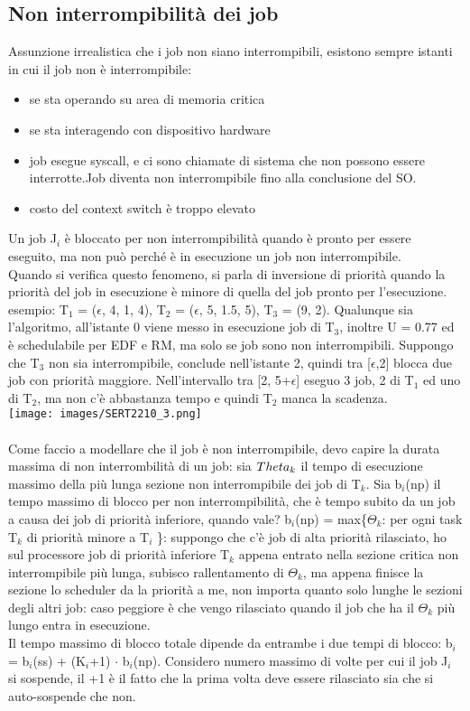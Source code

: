 \documentclass[18px]{article}
\begin{document}
\subsection{Non interrompibilità dei job}
Assunzione irrealistica che i job non siano interrompibili, esistono sempre istanti in cui il job non è interrompibile:
\begin{itemize}
\item se sta operando su area di memoria critica
\item se sta interagendo con dispositivo hardware
\item job esegue syscall, e ci sono chiamate di sistema che non possono essere interrotte.Job diventa non interrompibile fino alla conclusione del SO.
\item costo del context switch è troppo elevato
\end{itemize}
Un job J$_{i}$ è bloccato per non interrompibilità quando è  pronto per essere eseguito, ma non può perché è in esecuzione un job non interrompibile.\\ Quando si verifica questo fenomeno, si parla di inversione di priorità quando la priorità del job in esecuzione è minore di quella del job pronto per l'esecuzione. esempio: T$_{1}$ = ($\epsilon$, 4, 1, 4), T$_{2}$ = ($\epsilon$, 5, 1.5, 5), T$_{3}$ = (9, 2). Qualunque sia l'algoritmo, all'istante 0 viene messo in esecuzione job di T$_{3}$, inoltre U = 0.77 ed è schedulabile per EDF e RM, ma solo se job sono non interrompibili. Suppongo che T$_{3}$ non sia interrompibile, conclude nell'istante 2, quindi tra [$\epsilon$,2] blocca due job con priorità maggiore. Nell'intervallo tra [2, 5+$\epsilon$] eseguo 3 job, 2 di T$_{1}$ ed uno di T$_{2}$, ma non c'è abbastanza tempo e quindi T$_{2}$ manca la scadenza.\\ 
\texttt{[image: images/SERT2210\_3.png]}\\
\\Come faccio a modellare che il job è non interrompibile, devo capire la durata massima di non interrombilità di un job: sia $\\Theta_{k}$ il tempo di esecuzione massimo della più lunga sezione non interrompibile dei job di T$_{k}$. Sia b$_{i}$(np) il tempo massimo di blocco per non interrompibilità, che è tempo subito da un job a causa dei job di priorità inferiore, quando vale? b$_{i}$(np) = max\{$\Theta_{k}$: per ogni task T$_{k}$ di priorità minore a T$_{i}$ \}: suppongo che c'è job di alta priorità rilasciato, ho sul processore job di priorità inferiore T$_{k}$ appena entrato nella sezione critica non interrompibile più lunga, subisco rallentamento di $\Theta_{k}$, ma appena finisce la sezione lo scheduler da la priorità a me, non importa quanto solo lunghe le sezioni degli altri job: caso peggiore è che vengo rilasciato quando il job che ha il $\Theta_{k}$ più lungo entra in esecuzione.\\ Il tempo massimo di blocco totale dipende da entrambe i due tempi di blocco:
b$_{i}$ = b$_{i}$(ss) + (K$_{i}$+1) $\cdot$ b$_{i}$(np). Considero numero massimo di volte per cui il job J$_{i}$ si sospende, il +1 è il fatto che la prima volta deve essere rilasciato sia che si auto-sospende che non.
\end{document}
